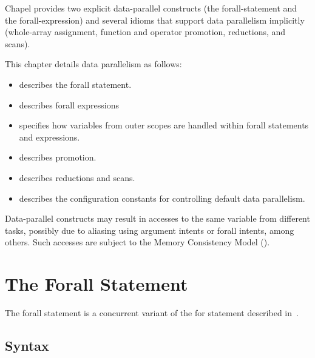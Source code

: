 \label{Data_Parallelism}

Chapel provides two explicit data-parallel constructs (the
forall-statement and the forall-expression) and several idioms that
support data parallelism implicitly (whole-array assignment, function
and operator promotion, reductions, and scans).

This chapter details data parallelism as follows:
\begin{itemize}
\item {} describes the forall statement.
\item {} describes forall expressions
\item {} specifies how variables from outer scopes
are handled within forall statements and expressions.
\item {} describes promotion.
\item {} describes reductions and scans.
\item {} describes the configuration constants for
controlling default data parallelism.
\end{itemize}       

Data-parallel constructs may result in accesses to the same variable
from different tasks, possibly due to aliasing using
 argument intents or forall intents, among others.
Such accesses are subject to the Memory Consistency Model
().

\section{The Forall Statement}
\label{Forall}

The forall statement is a concurrent variant of the for statement
described in~.

\subsection{Syntax}
\label{forall_syntax}

